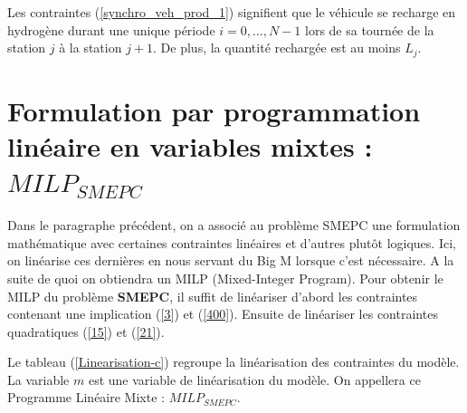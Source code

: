 Les contraintes (\ref{synchro_veh_prod_1})  signifient que le véhicule se recharge en hydrogène durant une unique période $i=0, \dots, N-1$ lors de sa tournée de la station $j$ à la station $j + 1$. De plus, la quantité rechargée est au moins $L_j$. 


\section{Formulation par programmation linéaire en variables mixtes : \textit{$MILP_{SMEPC}$}}%
\label{SMEPC_model}

Dans le paragraphe précédent, on a associé au problème SMEPC une formulation mathématique avec certaines contraintes linéaires et d'autres plutôt logiques. Ici, on linéarise ces dernières en nous servant du Big M lorsque c'est nécessaire. A la suite de quoi on obtiendra un MILP (Mixed-Integer Program).
 Pour obtenir le MILP du problème \textbf{SMEPC}, il suffit de linéariser d'abord les contraintes contenant une implication (\ref{3}) et (\ref{400}). Ensuite de linéariser les contraintes quadratiques  (\ref{15}) et (\ref{21}).

Le tableau (\ref{Linearisation-c}) regroupe la linéarisation des contraintes du modèle. La variable $m$ est une variable de linéarisation du modèle. On appellera ce Programme Linéaire Mixte :
\textit{$MILP_{SMEPC}$}. 


